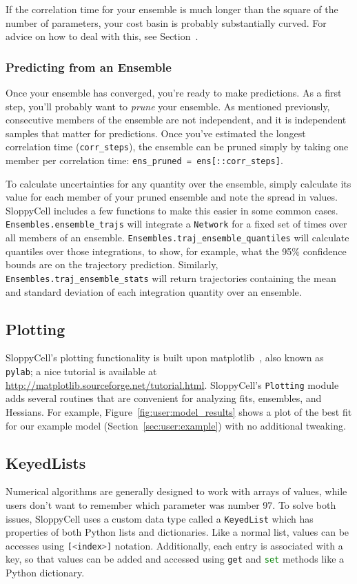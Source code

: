 \documentclass[12pt]{article}
\makeatletter
\newcommand{\py}[1]{\lstinline[language=Python, showstringspaces=False]@#1@}
\makeatother
\begin{document}
If the correlation time for your ensemble is much longer than the square of the number of parameters, your cost basin is probably substantially curved.
For advice on how to deal with this, see Section~\cite[Section 6.3]{bib:GutenkunstPhD}.

\subsubsection{Predicting from an Ensemble}

Once your ensemble has converged, you're ready to make predictions.
As a first step, you'll probably want to \emph{prune} your ensemble.
As mentioned previously, consecutive members of the ensemble are not independent, and it is independent samples that matter for predictions.
Once you've estimated the longest correlation time (\py{corr_steps}), the ensemble can be pruned simply by taking one member per correlation time: \py{ens_pruned = ens[::corr_steps]}.

To calculate uncertainties for any quantity over the ensemble, simply calculate its value for each member of your pruned ensemble and note the spread in values.
SloppyCell includes a few functions to make this easier in some common cases.
\py{Ensembles.ensemble_trajs} will integrate a \py{Network} for a fixed set of times over all members of an ensemble.
\py{Ensembles.traj_ensemble_quantiles} will calculate quantiles over those integrations, to show, for example, what the 95\% confidence bounds are on the trajectory prediction.
Similarly, \py{Ensembles.traj_ensemble_stats} will return trajectories containing the mean and standard deviation of each integration quantity over an ensemble.

\subsection{Plotting}

SloppyCell's plotting functionality is built upon matplotlib~\cite{bib:Hunter2007}, also known as \py{pylab}; a nice tutorial is available at \url{http://matplotlib.sourceforge.net/tutorial.html}.
SloppyCell's \py{Plotting} module adds several routines that are convenient for analyzing fits, ensembles, and Hessians.
For example, Figure~\ref{fig:user:model_results} shows a plot of the best fit for our example model (Section~\ref{sec:user:example}) with no additional tweaking.

\subsection{KeyedLists}
Numerical algorithms are generally designed to work with arrays of values, while users don't want to remember which parameter was number 97.
To solve both issues, SloppyCell uses a custom data type called a \py{KeyedList} which has properties of both Python lists and dictionaries.
Like a normal list, values can be accesses using \py{[<index>]} notation.
Additionally, each entry is associated with a key, so that values can be added and accessed using \py{get} and \py{set} methods like a Python dictionary.
\end{document}
